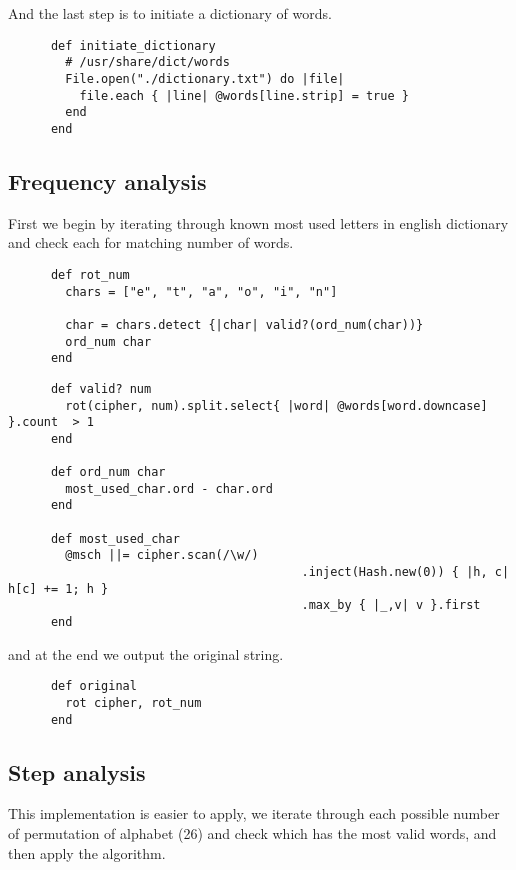 \documentclass{article}
\begin{document}
    And the last step is to initiate a dictionary of words.

    \begin{lstlisting}
      def initiate_dictionary
        # /usr/share/dict/words
        File.open("./dictionary.txt") do |file|
          file.each { |line| @words[line.strip] = true }
        end
      end
    \end{lstlisting}

    \newpage

  \subsection{Frequency analysis}

  First we begin by iterating through known most used
  letters in english dictionary and check each for matching
  number of words.

   \begin{lstlisting}
      def rot_num
        chars = ["e", "t", "a", "o", "i", "n"]

        char = chars.detect {|char| valid?(ord_num(char))}
        ord_num char
      end
   \end{lstlisting}

   \begin{lstlisting}
      def valid? num
        rot(cipher, num).split.select{ |word| @words[word.downcase] }.count  > 1
      end

      def ord_num char
        most_used_char.ord - char.ord
      end

      def most_used_char
        @msch ||= cipher.scan(/\w/)
                                         .inject(Hash.new(0)) { |h, c| h[c] += 1; h }
                                         .max_by { |_,v| v }.first
      end
   \end{lstlisting}

   and at the end we output the original string.

   \begin{lstlisting}
      def original
        rot cipher, rot_num
      end
   \end{lstlisting}

  \subsection{Step analysis}

  This implementation is easier to apply, we iterate through each
  possible number of permutation of alphabet (26) and check which
  has the most valid words, and then apply the algorithm.
\end{document}
